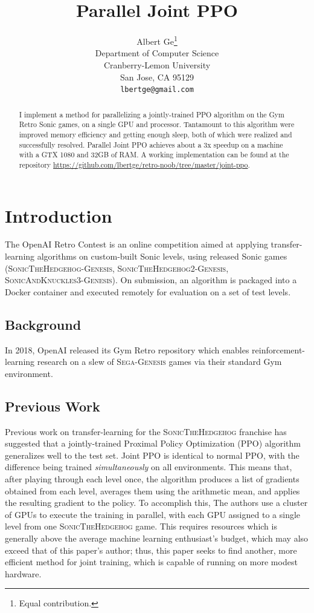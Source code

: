 \documentclass{article}
\title{Parallel Joint PPO}
\author{
  Albert Ge\thanks{Equal contribution.} \\
  Department of Computer Science\\
  Cranberry-Lemon University\\
  San Jose, CA 95129 \\
  \texttt{lbertge@gmail.com} \\
}
\begin{document}

\maketitle

\begin{abstract}
  I implement a method for parallelizing a jointly-trained PPO algorithm on the
  Gym Retro Sonic games, on a single GPU and processor. Tantamount to this algorithm were improved memory efficiency and getting enough sleep, both of which were realized and successfully resolved. Parallel Joint PPO achieves about a 3x speedup on a machine with a GTX 1080 and 32GB of RAM. A working implementation can be found at the repository \url{https://github.com/lbertge/retro-noob/tree/master/joint-ppo}.
\end{abstract}

\section{Introduction}

The OpenAI Retro Contest \cite{DBLP:journals/corr/abs-1804-03720} is an online competition aimed at applying transfer-learning algorithms on custom-built Sonic levels, using released Sonic games (\textsc{SonicTheHedgehog-Genesis}, \textsc{SonicTheHedgehog2-Genesis}, \textsc{SonicAndKnuckles3-Genesis}). On submission, an algorithm is packaged into a Docker container and executed remotely for evaluation on a set of test levels. 

\subsection{Background}

In 2018, OpenAI released its Gym Retro repository which enables reinforcement-learning research on a slew of \textsc{Sega-Genesis} games via their standard Gym environment. 

\subsection{Previous Work}

Previous work on transfer-learning for the \textsc{SonicTheHedgehog} franchise has suggested that a jointly-trained Proximal Policy Optimization \cite{DBLP:journals/corr/SchulmanWDRK17} (PPO) algorithm generalizes well to the test set. 
Joint PPO is identical to normal PPO, with the difference being trained \emph{simultaneously} on all environments. This means that, after playing through each level once, the algorithm produces a list of gradients obtained from each level, averages them using the arithmetic mean, and applies the resulting gradient to the policy. To accomplish this, The authors use a cluster of GPUs to execute the training in parallel, with each GPU assigned to a single level from one \textsc{SonicTheHedgehog} game. This requires resources which is generally above the average machine learning enthusiast's budget, which may also exceed that of this paper's author; thus, this paper seeks to find another, more efficient method for joint training, which is capable of running on more modest hardware.
\end{document}
